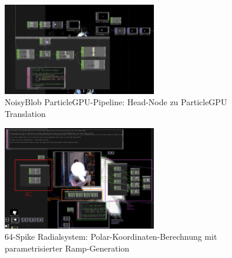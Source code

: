 \begin{figure}[!htbp]
    \centering
    \includegraphics[width=0.6\textwidth,height=0.25\textheight,keepaspectratio]{images/docupictures/NoisyBlob_HEAD_to_ParticleGPU_Translate.png}
    \caption{NoisyBlob ParticleGPU-Pipeline: Head-Node zu ParticleGPU Translation}
    \label{fig:particle_translation}
\end{figure}

\begin{figure}[!htbp]
    \centering
    \includegraphics[width=0.6\textwidth,height=0.25\textheight,keepaspectratio]{images/docupictures/TopDown_KreisZuRampsParametisierteBerechnungen.png}
    \caption{64-Spike Radialsystem: Polar-Koordinaten-Berechnung mit parametrisierter Ramp-Generation}
    \label{fig:radial_spike_system}
\end{figure}



